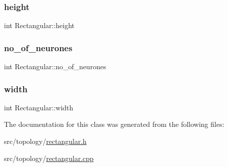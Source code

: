 \subsubsection{\texorpdfstring{height}{height}}
{\footnotesize\ttfamily int Rectangular\+::height}

\mbox{\label{class_rectangular_af5dd2b7923db8c1801c53a39baf4a278}} 
\subsubsection{\texorpdfstring{no\+\_\+of\+\_\+neurones}{no\_of\_neurones}}
{\footnotesize\ttfamily int Rectangular\+::no\+\_\+of\+\_\+neurones}

\mbox{\label{class_rectangular_a6a74241795eda772d1f9df3eba21d958}} 
\subsubsection{\texorpdfstring{width}{width}}
{\footnotesize\ttfamily int Rectangular\+::width}



The documentation for this class was generated from the following files\+:\begin{DoxyCompactItemize}
\item 
src/topology/\mbox{\hyperlink{rectangular_8h}{rectangular.\+h}}\item 
src/topology/\mbox{\hyperlink{rectangular_8cpp}{rectangular.\+cpp}}\end{DoxyCompactItemize}
